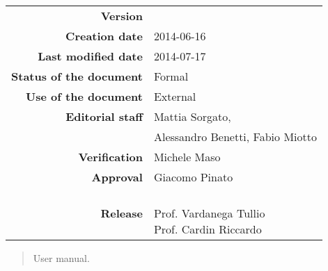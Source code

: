 


\newcommand{\Versione}{\versioneManualeUtente{}} %
\newcommand{\Data}{2014-06-16}				     %
\newcommand{\DataUltimaModifica}{2014-07-17}
\newcommand{\TipoDocumento}{User Manual}	 	%



\begin{center}
\begin{tabular}{r|l}
\textbf{Version} & \Versione{} \\
\textbf{Creation date} & \Data{} \\
\textbf{Last modified date} & \DataUltimaModifica{} \\
\textbf{Status of the document} & Formal \\		          %
\textbf{Use of the document} & External \\			          %
\textbf{Editorial staff} &  Mattia Sorgato,\\
& Alessandro Benetti, Fabio Miotto\\
\textbf{Verification} & Michele Maso\\  %
\textbf{Approval} & Giacomo Pinato\\				      %
\textbf{Release} & \parbox[t]{4cm}{\NomeGruppo{}\\Prof. Vardanega Tullio\\Prof. Cardin Riccardo\\ \Prop{} }\\
\end{tabular}
\end{center}

\vspace{0.05in}

\begin{abstract}
\begin{center}
\Progetto{} User manual.
\end{center}
\end{abstract}


